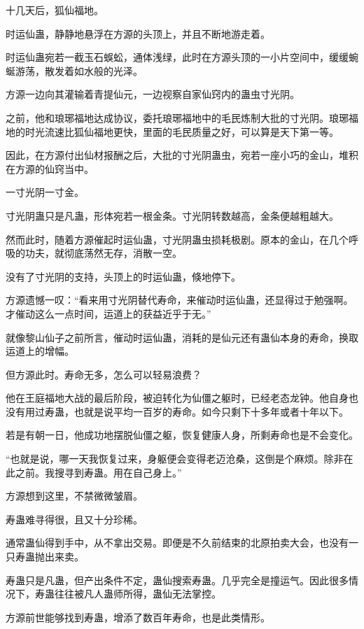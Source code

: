 
\begin{this_body}

十几天后，狐仙福地。

时运仙蛊，静静地悬浮在方源的头顶上，并且不断地游走着。

时运仙蛊宛若一截玉石蜈蚣，通体浅绿，此时在方源头顶的一小片空间中，缓缓蜿蜒游荡，散发着如水般的光泽。

方源一边向其灌输着青提仙元，一边视察自家仙窍内的蛊虫寸光阴。

之前，他和琅琊福地达成协议，委托琅琊福地中的毛民炼制大批的寸光阴。琅琊福地的时光流速比狐仙福地更快，里面的毛民质量之好，可以算是天下第一等。

因此，在方源付出仙材报酬之后，大批的寸光阴蛊虫，宛若一座小巧的金山，堆积在方源的仙窍当中。

一寸光阴一寸金。

寸光阴蛊只是凡蛊，形体宛若一根金条。寸光阴转数越高，金条便越粗越大。

然而此时，随着方源催起时运仙蛊，寸光阴蛊虫损耗极剧。原本的金山，在几个呼吸的功夫，就彻底荡然无存，消散一空。

没有了寸光阴的支持，头顶上的时运仙蛊，倏地停下。

方源遗憾一叹：“看来用寸光阴替代寿命，来催动时运仙蛊，还显得过于勉强啊。才催动这么一点时间，运道上的获益近乎于无。”

就像黎山仙子之前所言，催动时运仙蛊，消耗的是仙元还有蛊仙本身的寿命，换取运道上的增幅。

但方源此时。寿命无多，怎么可以轻易浪费？

他在王庭福地大战的最后阶段，被迫转化为仙僵之躯时，已经老态龙钟。他自身也没有用过寿蛊，也就是说平均一百岁的寿命。如今只剩下十多年或者十年以下。

若是有朝一日，他成功地摆脱仙僵之躯，恢复健康人身，所剩寿命也是不会变化。

“也就是说，哪一天我恢复过来，身躯便会变得老迈沧桑，这倒是个麻烦。除非在此之前。我搜寻到寿蛊。用在自己身上。”

方源想到这里，不禁微微皱眉。

寿蛊难寻得很，且又十分珍稀。

通常蛊仙得到手中，从不拿出交易。即便是不久前结束的北原拍卖大会，也没有一只寿蛊抛出来卖。

寿蛊只是凡蛊，但产出条件不定，蛊仙搜索寿蛊。几乎完全是撞运气。因此很多情况下，寿蛊往往被凡人蛊师所得，蛊仙无法掌控。

方源前世能够找到寿蛊，增添了数百年寿命，也是此类情形。


\end{this_body}
